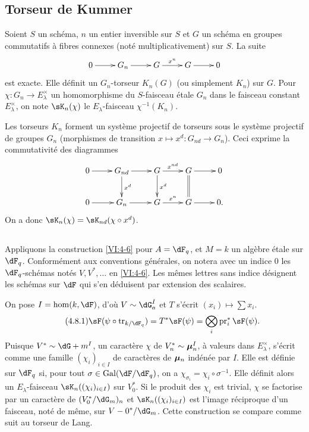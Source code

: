 \subsection{Torseur de Kummer}\label{VI:4-7}

Soient $S$ un sch\'ema, $n$ un entier inversible sur $S$ et $G$ un sch\'ema en 
groupes commutatifs \`a fibres connexes (not\'e multiplicativement) sur $S$. 
La suite 
\[\xymatrix{
  0 \ar[r] 
    & G_n \ar[r] 
    & G \ar[r]^-{x^n} 
    & G \ar[r] 
    & 0 
}\]
est exacte. Elle d\'efinit un $G_n$-torseur $K_n(G)$ (ou simplement $K_n$) sur 
$G$. Pour $\chi:G_n \to E_\lambda^\times$ un homomorphisme du $S$-faisceau 
\'etale $G_n$ dans le faisceau constant $E_\lambda^\times$, on note 
$\sK_n(\chi)$ le $E_\lambda$-faisceau $\chi^{-1}(K_n)$. 

Les torseurs $K_n$ forment un syst\`eme projectif de torseurs sous le 
syst\`eme projectif de groupes $G_n$ (morphismes de transition 
$x\mapsto x^d:G_{n d}\to G_n$). Ceci exprime la commutativit\'e des diagrammes 
\[\xymatrix{
  0 \ar[r] 
    & G_{n d} \ar[r] \ar[d]^-{x^d} 
    & G \ar[r]^-{x^{n d}} \ar[d]^-{x^d} 
    & G \ar[r] \ar@{=}[d] 
    & 0 \\
  0 \ar[r] 
    & G_n \ar[r] 
    & G \ar[r]^-{x^n} 
    & G \ar[r] 
    & 0 \text{.} 
}\]
On a donc $\sK_n(\chi) = \sK_{n d}(\chi\circ x^d)$. 





\subsection{}\label{VI:4-8}

Appliquons la construction \ref{VI:4-6} pour $A=\dF_q$, et $M=k$ un alg\`ebre 
\'etale sur $\dF_q$. Conform\'ement aux conventions g\'en\'erales, on notera 
avec un indice $0$ les $\dF_q$-sch\'emas not\'es $V,V^\ast,\ldots$ en 
\ref{VI:4-6}. Les m\^emes lettres sans indice d\'esignent les sch\'emas sur 
$\dF$ qui s'en d\'eduisent par extension des scalaires. 

On pose $I=\hom(k,\dF)$, d'o\`u $V\sim \dG_a^I$ et $T$ s'\'ecrit 
$(x_i)\mapsto \sum x_i$. 
\begin{equation*}\tag{4.8.1}\label{VI:eq:4-8-1}
  \sF(\psi\circ \tr_{k/\dF_q}) = T^\ast \sF(\psi) = \bigotimes_i \operatorname{pr}_i^\ast \sF(\psi) \text{.} 
\end{equation*}
Puisque $V^\ast\sim \dG+m^I$, un caract\`ere $\chi$ de $V_n^\ast\sim {\bm\mu}_n^I$, 
\`a valeurs dans $E_\lambda^\times$, s'\'ecrit comme une famille 
$(\chi_i)_{i\in I}$ de caract\`eres de ${\bm\mu}_n$ ind\'en\'ee par $I$. Elle est 
d\'efinie sur $\dF_q$ si, pour tout $\sigma\in \gal(\dF/\dF_q)$, on a 
$\chi_{\sigma_i} = \chi_i\circ \sigma^{-1}$. Elle d\'efinit alors un 
$E_\lambda$-faisceau $\sK_n((\chi_i)_{i\in I})$ sur $V_0^\ast$. Si le produit 
des $\chi_i$ est trivial, $\chi$ se factorise par un caract\`ere de 
$(V_0^\ast/\dG_m)_n$ et $\sK_n((\chi_i)_{i\in I})$ est l'image r\'eciproque 
d'un faisceau, not\'e de m\^eme, sur $V-0^\ast/\dG_m$. Cette construction se 
compare comme suit au torseur de Lang. 





